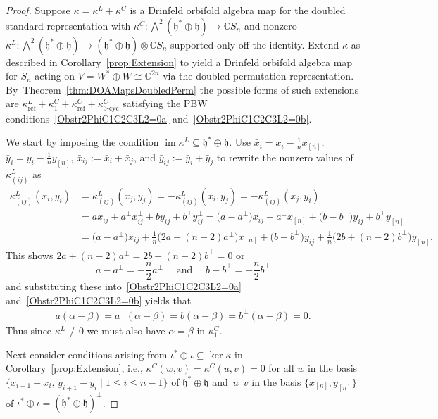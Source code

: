 \documentclass[10pt,a4paper]{amsart}
\numberwithin{equation}{section}
\DeclareMathOperator{\im}{im}
\DeclareMathOperator{\refl}{ref}
\DeclareMathOperator{\tri}{3-cyc}
\begin{document}
\begin{proof}Suppose $\kappa=\kappa^L+\kappa^C$ is a Drinfeld orbifold algebra map for the doubled
standard representation with $\kappa^C\colon \bigwedge^2 (\mathfrak{h}^*\oplus\mathfrak{h}) \to \mathbb{C} S_n$ and
nonzero $\kappa^L\colon \bigwedge^2 (\mathfrak{h}^*\oplus\mathfrak{h}) \to (\mathfrak{h}^*\oplus\mathfrak{h}) \otimes \mathbb{C} S_n$ supported
only off the identity. Extend $\kappa$ as described in Corollary~\ref{prop:Extension}
to yield a Drinfeld orbifold algebra map for $S_n$ acting on $V=W^* \oplus W \cong \mathbb{C}^{2n}$
via the doubled permutation representation. By~Theorem~\ref{thm:DOAMapsDoubledPerm} the
possible forms of such extensions are
$\kappa^L_{\refl}+\kappa^C_1+\kappa^C_{\refl}+\kappa^C_{\tri}$
satisfying the PBW conditions~\eqref{Obstr2PhiC1C2C3L2=0a} and~\eqref{Obstr2PhiC1C2C3L2=0b}.

We start by imposing the condition $\im \kappa^L \subseteq \mathfrak{h}^*\oplus\mathfrak{h}$.
Use $\bar{x}_i=x_i-\tfrac{1}{n}x_{[n]}$, $\bar{y}_i=y_i-\tfrac{1}{n}y_{[n]}$,
$\bar{x}_{ij}:=\bar{x}_i+\bar{x}_j$, and $\bar{y}_{ij}:=\bar{y}_i+\bar{y}_j$ to
rewrite the nonzero values of $\kappa^L_{(ij)}$ as
\begin{align*}
\kappa^L_{(ij)}(x_i,y_i)&=\kappa^L_{(ij)}(x_j,y_j)=-\kappa^L_{(ij)}(x_i,y_j)=-\kappa^L_{(ij)}(x_j,y_i) \\
&=ax_{ij}+a^\perp x_{ij}^\perp + by_{ij}+b^\perp y_{ij}^\perp
=\big(a-a^\perp\big)x_{ij}+a^\perp x_{[n]}+\big(b-b^\perp\big)y_{ij}+b^\perp y_{[n]}
\\
&=\big(a\!-a^\perp\big)\bar{x}_{ij}\!+\frac{1}{n}\big(2a+(n\!-2)a^\perp\big) x_{[n]}\!+\big(b\!-b^\perp\big)\bar{y}_{ij}\!+\frac{1}{n}\big(2b+(n\!-2)b^\perp\big) y_{[n]}.
\end{align*}
This shows
$2a+(n-2)a^\perp=2b+(n-2)b^\perp=0$ or
\begin{equation}
\label{arelatedtoaperp}
a-a^\perp=-\frac{n}{2}a^\perp \quad \text{ and } \quad b-b^\perp=-\frac{n}{2}b^\perp
\end{equation}
and substituting these into~\eqref{Obstr2PhiC1C2C3L2=0a}
and~\eqref{Obstr2PhiC1C2C3L2=0b} yields that{\samepage
\begin{gather*}
a(\alpha-\beta)=a^\perp(\alpha-\beta)=b(\alpha-\beta)=b^\perp(\alpha-\beta)=0.
\end{gather*}
Thus since $\kappa^L \not \equiv 0$ we must also have $\alpha=\beta$ in $\kappa^C_1$.}

Next consider conditions arising from $\iota^*\oplus\iota\subseteq\ker\kappa$ in
Corollary~\ref{prop:Extension}, i.e., $\kappa^C(w,v)=\kappa^C(u,v)=0$
for all $w$ in the basis $\{x_{i+1}-x_i,\, y_{i+1}-y_i \mid 1 \leq i \leq n-1 \}$
of $\mathfrak{h}^*\oplus\mathfrak{h}$ and~$u$~$v$ in the basis $\{x_{[n]},y_{[n]}\}$
of $\iota^* \oplus \iota=(\mathfrak{h}^*\oplus\mathfrak{h})^\perp$.


\end{proof}
\end{document}
